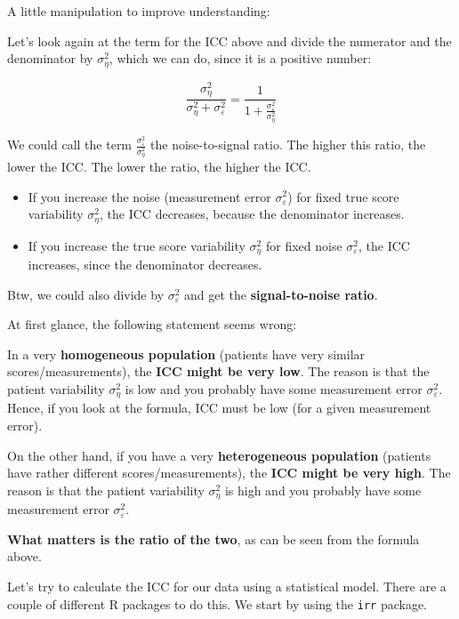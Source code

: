 \documentclass[
]{book}
\providecommand{\tightlist}{%
  \setlength{\itemsep}{0pt}\setlength{\parskip}{0pt}}
\begin{document}
A little manipulation to improve understanding:

Let's look again at the term for the ICC above and divide the numerator and the denominator by
\(\sigma_{\eta}^2\), which we can do, since it is a positive number:

\[\frac{\sigma_{\eta}^2}{\sigma_{\eta}^2 + \sigma_{\varepsilon}^2} = \frac{1}{1 + \frac{\sigma_{\varepsilon}^2}{\sigma_{\eta}^2}}\]

We could call the term \(\frac{\sigma_{\varepsilon}^2}{\sigma_{\eta}^2}\) the noise-to-signal ratio.
The higher this ratio, the lower the ICC. The lower the ratio, the higher the ICC.

\begin{itemize}
\tightlist
\item
  If you increase the noise (measurement error \(\sigma_{\varepsilon}^2\)) for fixed
  true score variability \(\sigma_{\eta}^2\), the ICC decreases, because the denominator
  increases.
\item
  If you increase the true score variability \(\sigma_{\eta}^2\) for fixed noise \(\sigma_{\varepsilon}^2\),
  the ICC increases, since the denominator decreases.
\end{itemize}

Btw, we could also divide by \(\sigma_{\varepsilon}^2\) and get the \textbf{signal-to-noise ratio}.

At first glance, the following statement seems wrong:

In a very \textbf{homogeneous population} (patients have very similar scores/measurements),
the \textbf{ICC might be very low}. The reason is that the patient variability \(\sigma_{\eta}^2\) is low
and you probably have some measurement error \(\sigma_{\varepsilon}^2\).
Hence, if you look at the formula, ICC must be low (for a given measurement error).

On the other hand, if you have a very \textbf{heterogeneous population} (patients have rather different
scores/measurements), the \textbf{ICC might be very high}.
The reason is that the patient variability \(\sigma_{\eta}^2\) is high and you probably
have some measurement error \(\sigma_{\varepsilon}^2\).

\textbf{What matters is the ratio of the two}, as can be seen from the formula above.

Let's try to calculate the ICC for our data using a statistical model. There are a couple of different
R packages to do this. We start by using the \texttt{irr} package.
\end{document}
